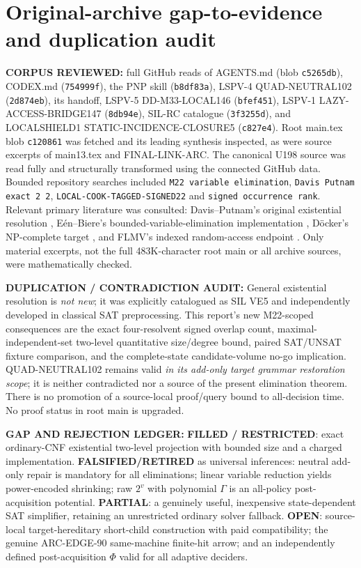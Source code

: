 \documentclass[11pt]{article}
\begin{document}
\section{Original-archive gap-to-evidence and duplication audit}
\textbf{CORPUS REVIEWED:} full GitHub reads of AGENTS.md
(blob \texttt{c5265db}), CODEX.md (\texttt{754999f}),
the PNP skill (\texttt{b8df83a}), LSPV-4 QUAD-NEUTRAL102
(\texttt{2d874eb}), its handoff, LSPV-5 DD-M33-LOCAL146
(\texttt{bfef451}), LSPV-1 LAZY-ACCESS-BRIDGE147
(\texttt{8db94e}), SIL-RC catalogue (\texttt{3f3255d}),
and LOCALSHIELD1 STATIC-INCIDENCE-CLOSURE5
(\texttt{c827e4}). Root main.tex blob \texttt{c120861}
was fetched and its leading synthesis inspected, as were
source excerpts of main13.tex and FINAL-LINK-ARC.
The canonical U198 source was read fully and structurally
transformed using the connected GitHub data. Bounded repository
searches included \texttt{M22 variable elimination},
\texttt{Davis Putnam exact 2 2},
\texttt{LOCAL-COOK-TAGGED-SIGNED22} and \texttt{signed occurrence rank}.
Relevant primary literature was consulted:
Davis--Putnam's original existential resolution \cite{dp},
E\'en--Biere's bounded-variable-elimination implementation
\cite{een}, D\"ocker's NP-complete target \cite{docker},
and FLMV's indexed random-access endpoint \cite{flmv}.
Only material excerpts, not the full 483K-character root main
or all archive sources, were mathematically checked.

\textbf{DUPLICATION / CONTRADICTION AUDIT:}
General existential resolution is \emph{not new}; it was
explicitly catalogued as SIL VE5 and independently developed
in classical SAT preprocessing. This report's new
M22-scoped consequences are the exact four-resolvent signed
overlap count, maximal-independent-set two-level quantitative
size/degree bound, paired SAT/UNSAT fixture comparison, and
the complete-state candidate-volume no-go implication.
QUAD-NEUTRAL102 remains valid \emph{in its add-only target
grammar restoration scope}; it is neither contradicted nor
a source of the present elimination theorem.
There is no promotion of a source-local proof/query bound to
all-decision time. No proof status in root main is upgraded.

\textbf{GAP AND REJECTION LEDGER:}
\textbf{FILLED / RESTRICTED}: exact ordinary-CNF existential
two-level projection with bounded size and a charged implementation.
\textbf{FALSIFIED/RETIRED} as universal inferences:
neutral add-only repair is mandatory for all eliminations;
linear variable reduction yields power-encoded shrinking;
raw \(2^v\) with polynomial \(\Gamma\) is an all-policy
post-acquisition potential.
\textbf{PARTIAL}: a genuinely useful, inexpensive
state-dependent SAT simplifier, retaining an unrestricted
ordinary solver fallback.
\textbf{OPEN}: source-local target-hereditary short-child
construction with paid compatibility; the genuine ARC-EDGE-90
same-machine finite-hit arrow; and an independently defined
post-acquisition \(\Phi\) valid for all adaptive deciders.
\end{document}
